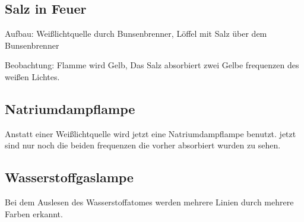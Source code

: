 \subsection{Salz in Feuer}

Aufbau: Weißlichtquelle durch Bunsenbrenner, Löffel mit Salz über dem Bunsenbrenner

Beobachtung: Flamme wird Gelb, Das Salz absorbiert zwei Gelbe frequenzen des weißen Lichtes.

\subsection{Natriumdampflampe}

Anstatt einer Weißlichtquelle wird jetzt eine Natriumdampflampe benutzt. jetzt sind nur noch die beiden frequenzen die vorher absorbiert wurden zu sehen.

\subsection{Wasserstoffgaslampe}

Bei dem Auslesen des Wasserstoffatomes werden mehrere Linien durch mehrere Farben erkannt.



